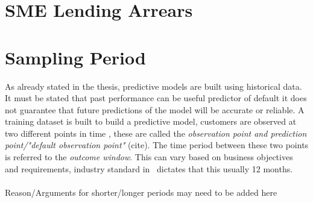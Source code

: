 \begin{comment}
rule applied to Census towns.  1 SAPS – Small Area Population Statistics  For census reports, urban settlements are towns with a population of 1,500 or more, while settlements with a population  of less than 1,500 are classified as rural.

\end{comment}

\section{SME Lending Arrears}

\section{Sampling Period}
As already stated in the thesis, predictive models are built using historical data. It must be stated that past performance can be useful predictor of default it does not guarantee that future predictions of the model will be accurate or reliable. A training dataset is built to build a predictive model, customers are observed at two different points in time \citep{martens_credit_2010}, these are called the \textit{observation point and prediction point/"default observation point"} (cite). The time period between these two points is referred to the \textit{outcome window}. This can vary based on business objectives and requirements, industry standard in \subjectname\ dictates that this usually 12 months. \\\\

Reason/Arguments for shorter/longer periods may need to be added here \\

